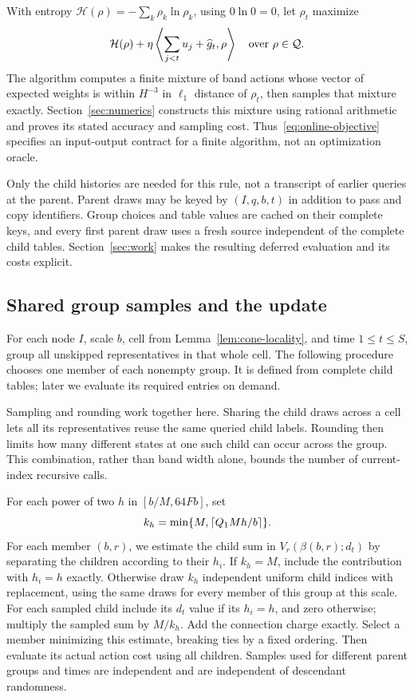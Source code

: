 With entropy $\mathcal H(\rho)=-\sum_k\rho_k\ln\rho_k$, using
$0\ln0=0$, let $\rho_t$ maximize
\begin{equation}\label{eq:online-objective}
 \mathcal H(\rho)+
 \eta\left\langle\sum_{j<t}u_j+\widehat g_t,\rho\right\rangle
 \quad\hbox{over }\rho\in\mathcal Q.
\end{equation}
The algorithm computes a finite mixture of band actions whose vector
of expected weights is within $H^{-3}$ in $\ell_1$ distance of
$\rho_t$, then samples that mixture exactly.  Section~\ref{sec:numerics}
constructs this mixture using rational arithmetic and proves its stated
accuracy and sampling cost.  Thus~\eqref{eq:online-objective} specifies
an input-output contract for a finite algorithm, not an optimization
oracle.

Only the child histories are needed for this rule, not a transcript of
earlier queries at the parent.  Parent draws may be keyed by
$(I,q,b,t)$ in addition to pass and copy identifiers.  Group choices
and table values are cached on their complete keys, and every first
parent draw uses a fresh source independent of the complete child
tables.  Section~\ref{sec:work} makes the resulting deferred evaluation
and its costs explicit.

\subsection{Shared group samples and the update}

For each node $I$, scale $b$, cell from
Lemma~\ref{lem:cone-locality}, and time $1\le t\le S$, group all
unskipped representatives in that whole cell.  The following procedure
chooses one member of each nonempty group.  It is defined from complete
child tables; later we evaluate its required entries on demand.

Sampling and rounding work together here. Sharing the child draws
across a cell lets all its representatives reuse the same queried child
labels. Rounding then limits how many different states at one such child
can occur across the group. This combination, rather than band width
alone, bounds the number of current-index recursive calls.

For each power of two $h$ in $[b/M,64Fb]$, set
\[
 k_h=\min\{M,\lceil Q_1Mh/b\rceil\}.
\]
For each member $(b,r)$, we estimate the child sum in
$V_r(\beta(b,r);d_t)$ by separating the children according to their
$h_i$.  If $k_h=M$, include the contribution with $h_i=h$ exactly.
Otherwise draw $k_h$ independent uniform child indices with replacement,
using the same draws for every member of this group at this scale.
For each sampled child include its $d_t$ value if its $h_i=h$, and zero
otherwise; multiply the sampled sum by $M/k_h$.  Add the connection
charge exactly.  Select a member minimizing this estimate, breaking
ties by a fixed ordering.  Then evaluate its actual action cost using
all children.  Samples used for different parent groups and times are
independent and are independent of descendant randomness.

